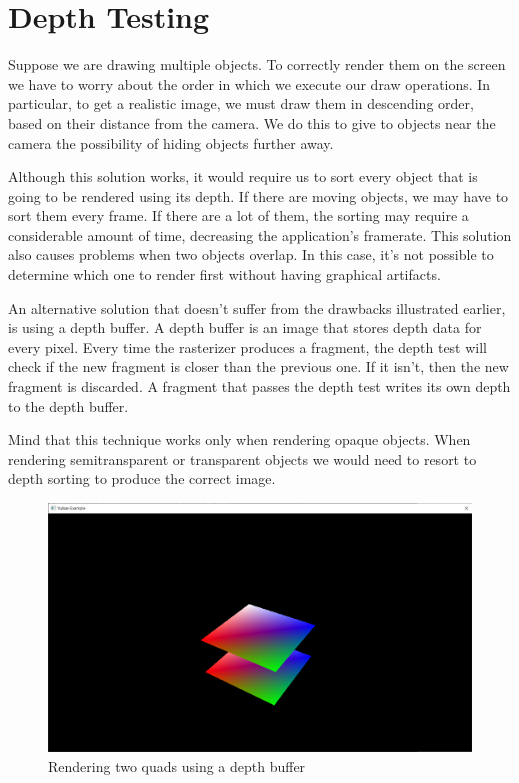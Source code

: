 \chapter{Depth Testing}
\label{chap:DepthTesting}

Suppose we are drawing multiple objects.
To correctly render them on the screen we have to worry about
the order in which we execute our draw operations.
In particular, to get a realistic image, we must draw
them in descending order, based on their distance from the camera.
We do this to give to objects near the camera the possibility
of hiding objects further away.

Although this solution works, it would require us to sort
every object that is going to be rendered using its depth.
If there are moving objects, we may have to sort them every frame.
If there are a lot of them, the sorting may require a considerable
amount of time, decreasing the application's framerate.
This solution also causes problems when two objects overlap.
In this case, it's not possible to determine which one
to render first without having graphical artifacts.

An alternative solution that doesn't suffer from the drawbacks
illustrated earlier, is using a depth buffer.
A depth buffer is an image that stores depth data for every pixel.
Every time the rasterizer produces a fragment, the depth test will
check if the new fragment is closer than the previous one.
If it isn't, then the new fragment is discarded.
A fragment that passes the depth test writes its own depth to the
depth buffer.

Mind that this technique works only when rendering opaque objects.
When rendering semitransparent or transparent objects we would need
to resort to depth sorting to produce the correct image.

\begin{figure}[H]
    \centering
    \includegraphics[scale=0.20]{images/ChDepthTesting/DepthTesting.png}
    \caption{Rendering two quads using a depth buffer}
    \label{fig::DepthTesting}
\end{figure}

